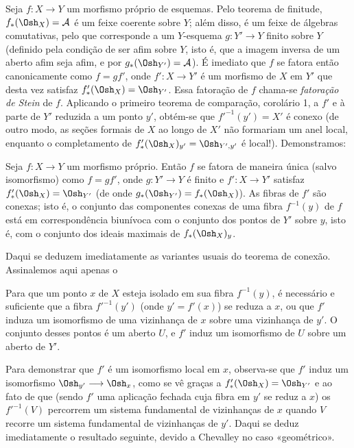Seja $f:X\longrightarrow Y$ um morfismo próprio de esquemas. Pelo teorema de
finitude, $f_*(\Osh_X)=\mathcal A$ é um feixe coerente sobre $Y$; além disso, é um
feixe de álgebras comutativas, pelo que corresponde a um $Y$-esquema
$g:Y'\longrightarrow Y$ finito sobre $Y$ (definido pela condição de ser afim
sobre $Y$, isto é, que a imagem inversa de um aberto afim seja afim, e por
$g_*(\Osh_{Y'})=\mathcal A$). É imediato que $f$ se fatora então
canonicamente como $f=gf'$, onde $f':X\longrightarrow Y'$ é um morfismo de
$X$ em $Y'$ que desta vez satisfaz $f'_*(\Osh_X)=\Osh_{Y'}$. Essa fatoração
de $f$ chama-se \emph{fatoração de Stein} de $f$. Aplicando o primeiro
teorema de comparação, corolário 1, a $f'$ e à parte de $Y'$ reduzida a um
ponto $y'$, obtém-se que $f'^{-1}(y')=X'$ é conexo (de outro modo, as
seções formais de $X$ ao longo de $X'$ não formariam um anel local,
enquanto o completamento de
$f'_*(\Osh_X)_{y'}=\Osh_{Y',y'}$ é local!). Demonstramos:

 Seja
$f:X\longrightarrow Y$ um morfismo próprio. Então $f$ se fatora de maneira
única (salvo isomorfismo) como $f=gf'$, onde $g:Y'\longrightarrow Y$ é finito
e $f':X\longrightarrow Y'$ satisfaz $f'_*(\Osh_X)=\Osh_{Y'}$ (de onde
$g_*(\Osh_{Y'})=f_*(\Osh_X)$). As fibras de $f'$ são conexas; isto é, o
conjunto das componentes conexas de uma fibra $f^{-1}(y)$ de $f$ está em
correspondência biunívoca com o conjunto dos pontos de $Y'$ sobre $y$, isto
é, com o conjunto dos ideais maximais de $f_*(\Osh_X)_y$.

Daqui se deduzem imediatamente as variantes usuais do teorema de
conexão. Assinalemos aqui apenas o

 Para que um ponto $x$ de $X$ esteja isolado em sua fibra
$f^{-1}(y)$, é necessário e suficiente que a fibra $f'^{-1}(y')$ (onde
$y'=f'(x)$) se reduza a $x$, ou que $f'$ induza um isomorfismo de uma
vizinhança de $x$ sobre uma vizinhança de $y'$. O conjunto desses pontos é um
aberto $U$, e $f'$ induz um isomorfismo de $U$ sobre um aberto de $Y'$.

Para demonstrar que $f'$ é um isomorfismo local em $x$, observa-se que $f'$
induz um isomorfismo $\Osh_{y'}\longrightarrow\Osh_x$, como se vê graças a
$f'_*(\Osh_X)=\Osh_{Y'}$ e ao fato de que (sendo $f'$ uma aplicação fechada
cuja fibra em $y'$ se reduz a $x$) os $f'^{-1}(V)$ percorrem um sistema
fundamental de vizinhanças de $x$ quando $V$ recorre um sistema fundamental de
vizinhanças de $y'$. Daqui se deduz imediatamente o resultado seguinte, devido a
Chevalley no caso «geométrico».

